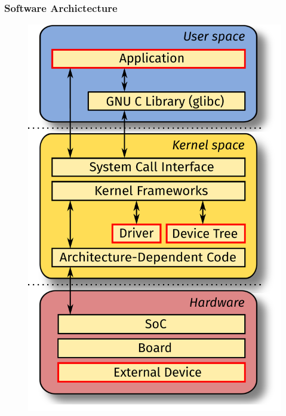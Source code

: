 \begin{frame}
  \frametitle{Software Archictecture}
  \begin{figure}
    \centering
    \includegraphics[scale=0.23]{images/architecture.pdf}
  \end{figure}
  \vspace*{-12mm}
\end{frame}

